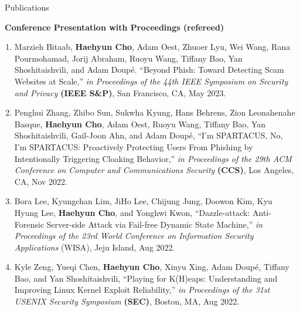 \documentclass{resume} %
\begin{document}
\begin{rSection}{\faGenderless~Publications}



    \strut\textbullet~{\bf Conference Presentation with Proceedings (refereed)}
    \begin{enumerate}[leftmargin=0pt]
		\item Marzieh Bitaab, \textbf{Haehyun Cho}, Adam Oest, Zhuoer Lyu, Wei Wang, Rana Pourmohamad, Jorij Abraham, Ruoyu Wang, Tiffany Bao, Yan Shoshitaishvili, and Adam Doup\'e.
		``Beyond Phish: Toward Detecting Scam Websites at Scale,''
		\emph{in Proceedings of the 44th IEEE Symposium on Security and Privacy} \textbf{(IEEE S\&P)},
    	San Francisco, CA, May 2023.\\
		
		\item Penghui Zhang, Zhibo Sun, Sukwha Kyung, Hans Behrens, Zion Leonahenahe Basque, \textbf{Haehyun Cho}, Adam Oest, Ruoyu Wang, Tiffany Bao, Yan Shoshitaishvili, Gail-Joon Ahn, and Adam Doup\'e, 
		``I'm SPARTACUS, No, I'm SPARTACUS: Proactively Protecting Users From Phishing by Intentionally Triggering Cloaking Behavior,''
		\emph{in Proceedings of the 29th ACM Conference on Computer and Communications Security} \textbf{(CCS)},
		Los Angeles, CA, Nov 2022.

		\item Bora Lee, Kyungchan Lim, JiHo Lee, Chijung Jung, Doowon Kim, Kyu Hyung Lee, \textbf{Haehyun Cho}, and Yonghwi Kwon,
		``Dazzle-attack: Anti-Forensic Server-side Attack via Fail-free Dynamic State Machine,''
		\emph{in Proceedings of the 23rd World Conference on Information Security Applications} (WISA), 
		Jeju Island, Aug 2022.
		
		\item Kyle Zeng, Yueqi Chen, \textbf{Haehyun Cho}, Xinyu Xing, Adam Doup\'e, Tiffany Bao, and Yan Shoshitaishvili,
		``Playing for K(H)eaps: Understanding and Improving Linux Kernel Exploit Reliability,'' 
		\emph{in Proceedings of the 31st USENIX Security Symposium} \textbf{(SEC)},
		Boston, MA, Aug 2022.



\end{enumerate}
\end{rSection}
\end{document}

